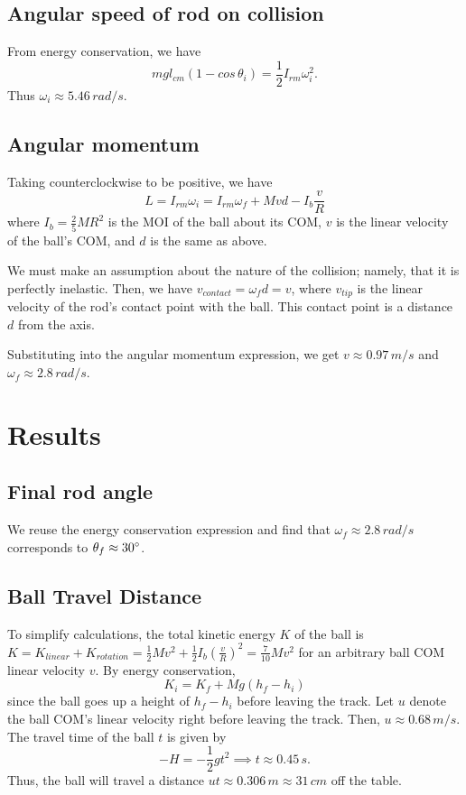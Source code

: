 \documentclass[12pt]{article} %
\begin{document}
\subsection{Angular speed of rod on collision}

From energy conservation, we have
$$mgl_{cm}(1-cos\,\theta_i) = \frac{1}{2}I_{rm}\omega_i^2.$$
Thus $\omega_i \approx 5.46\, rad/s$.

\subsection{Angular momentum}

Taking counterclockwise to be positive, we have
$$L = I_{rm}\omega_i = I_{rm}\omega_f + Mvd - I_{b}\frac{v}{R}$$
where $I_b = \frac{2}{5}MR^2$ is the MOI of the ball about its COM, $v$ is the linear velocity of the ball's COM, and $d$ is the same as above.

We must make an assumption about the nature of the collision; namely, that it is perfectly inelastic.
Then, we have $v_{contact} = \omega_fd = v$, where $v_{tip}$ is the linear velocity of the rod's contact point with the ball. This contact point is a distance $d$ from the axis.

Substituting into the angular momentum expression, we get $v \approx 0.97\,m/s$ and $\omega_f \approx 2.8\,rad/s$.

\section{Results}

\subsection{Final rod angle}

We reuse the energy conservation expression and find that $\omega_f \approx 2.8\,rad/s$ corresponds to $\theta_f \approx 30\degree$.

\subsection{Ball Travel Distance}

To simplify calculations, the total kinetic energy $K$ of the ball is $K = K_{linear} + K_{rotation} = \frac{1}{2}Mv^2 + \frac{1}{2}I_b(\frac{v}{R})^2 = \frac{7}{10}Mv^2$ for an arbitrary ball COM linear velocity $v$.
By energy conservation,
$$K_i = K_f + Mg(h_f - h_i)$$
since the ball goes up a height of $h_f - h_i$ before leaving the track. Let $u$ denote the ball COM's linear velocity right before leaving the track. Then, $u \approx 0.68\,m/s$.
The travel time of the ball $t$ is given by
$$-H = -\frac{1}{2}gt^2 \implies t \approx 0.45\,s.$$
Thus, the ball will travel a distance $ut \approx 0.306\,m \approx 31\,cm$ off the table.
\end{document}
